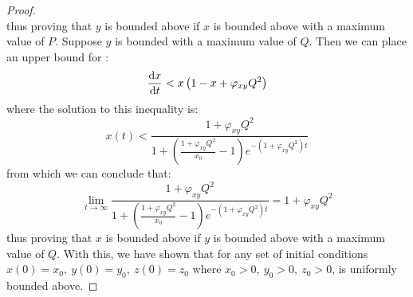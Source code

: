 \begin{proof}
\begin{equation*}
    \end{equation*}
    thus proving that $y$ is bounded above if $x$ is bounded above with a maximum value of $P$. Suppose $y$ is bounded with a maximum value of $Q$. Then we can place an upper bound for :
    \begin{equation*}
        \diff[]{x}{t} < x\left(1-x+\varphi_{xy}Q^2\right)
    \end{equation*}
    where the solution to this inequality is:
    \begin{equation*}
        x(t) < \frac{1+\varphi_{xy}Q^2}{1+\left(\frac{1+\varphi_{xy}Q^2}{x_0}-1\right)e^{-\left(1+\varphi_{xy}Q^2\right)t}}
    \end{equation*}
    from which we can conclude that:
    \begin{equation*}
        \lim_{t\to\infty} \frac{1+\varphi_{xy}Q^2}{1+\left(\frac{1+\varphi_{xy}Q^2}{x_0}-1\right)e^{-\left(1+\varphi_{xy}Q^2\right)t}} = 1+\varphi_{xy}Q^2
    \end{equation*}
    thus proving that $x$ is bounded above if $y$ is bounded above with a maximum value of $Q$. With this, we have shown that for any set of initial conditions $x(0) = x_0,\ y(0) = y_0,\ z(0) = z_0$ where $x_0 > 0,\ y_0 > 0,\ z_0 > 0$,  is uniformly bounded above.
\end{proof}
